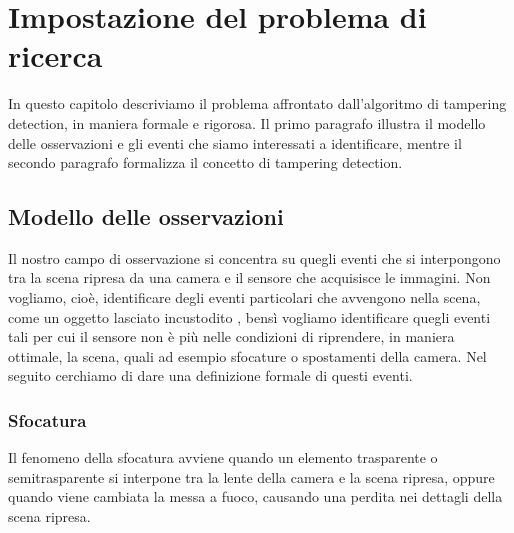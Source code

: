 \chapter{Impostazione del problema di ricerca}
\label{FormulazioneProblema}
\thispagestyle{empty}

\vspace{0.5cm}
In questo capitolo descriviamo il problema affrontato dall'algoritmo di tampering detection, in maniera formale e rigorosa. Il primo paragrafo illustra il modello delle osservazioni e gli eventi che siamo interessati a identificare, mentre il secondo paragrafo formalizza il concetto di tampering detection. 
\noindent 
\section{Modello delle osservazioni}
Il nostro campo di osservazione si concentra su quegli eventi che si interpongono tra la scena ripresa da una camera e il sensore che acquisisce le immagini. Non vogliamo, cio\`e, identificare degli eventi particolari che avvengono nella scena, come un oggetto lasciato incustodito \cite{Targhe}, bens\`i vogliamo identificare quegli eventi tali per cui il sensore non \`e pi\`u nelle condizioni di riprendere, in maniera ottimale, la scena, quali ad esempio sfocature o spostamenti della camera.
Nel seguito cerchiamo di dare una definizione formale di questi eventi.
\subsection{Sfocatura}
Il fenomeno della sfocatura avviene quando un elemento trasparente o semitrasparente si interpone tra la lente della camera e la \gls{scena} ripresa, oppure quando viene cambiata la messa a fuoco, causando una perdita nei dettagli della \gls{scena} ripresa.

